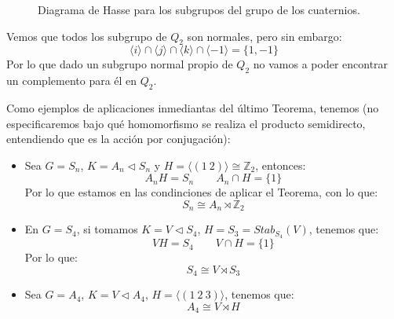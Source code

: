 \begin{ejemplo}
\begin{itemize}
\begin{figure}[H]
                \caption{Diagrama de Hasse para los subgrupos del grupo de los cuaternios.}
            \end{figure}
            Vemos que todos los subgrupo de $Q_2$ son normales, pero sin embargo:
            \begin{equation*}
                \langle i \rangle \cap \langle j \rangle  \cap \langle k \rangle  \cap \langle -1 \rangle  = \{1, -1\}
            \end{equation*}
            Por lo que dado un subgrupo normal propio de $Q_2$ no vamos a poder encontrar un complemento para él en $Q_2$.
    \end{itemize}
\end{ejemplo}

\begin{ejemplo}
    Como ejemplos de aplicaciones inmediantas del último Teorema, tenemos (no especificaremos bajo qué homomorfismo se realiza el producto semidirecto, entendiendo que es la acción por conjugación):
    \begin{itemize}
        \item Sea $G = S_n$, $K = A_n \lhd S_n$ y $H = \langle (1\ 2) \rangle \cong \mathbb{Z}_2 $, entonces:
            \begin{equation*}
                A_n H = S_n \qquad A_n\cap H = \{1\}
            \end{equation*}
            Por lo que estamos en las condinciones de aplicar el Teorema, con lo que:
            \begin{equation*}
                S_n\cong A_n \rtimes \mathbb{Z}_2
            \end{equation*}
        \item En $G = S_4$, si tomamos $K = V\lhd S_4$, $H = S_3 = Stab_{S_4}(V)$, tenemos que:
            \begin{equation*}
                VH = S_4 \qquad V\cap H = \{1\}
            \end{equation*}
            Por lo que:
            \begin{equation*}
                S_4\cong V\rtimes S_3
            \end{equation*}
        \item Sea $G = A_4$, $K = V\lhd A_4$, $H = \langle (1\ 2\ 3) \rangle $, tenemos que:
            \begin{equation*}
                A_4\cong V\rtimes H
            \end{equation*}
    \end{itemize}
\end{ejemplo}

